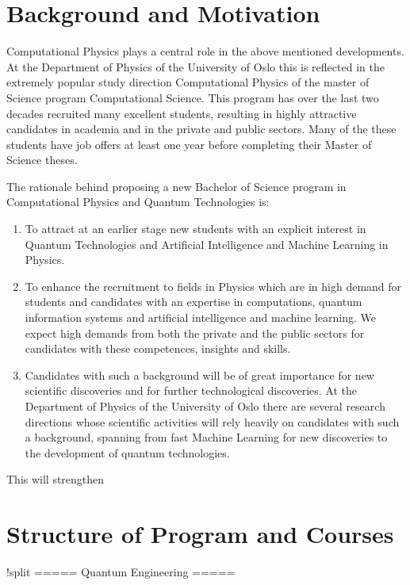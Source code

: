 \documentclass[oneside,final,10pt]{article}
\begin{document}
\section{Background and Motivation}

Computational Physics plays a central role in the above mentioned   developments. At the Department of Physics of the University of Oslo this is reflected in the extremely popular study direction Computational Physics of the master of Science program Computational Science. This program has over the last two decades recruited many excellent students, resulting in highly attractive candidates in academia and in  the private and public sectors. Many of the these students have job offers at least one year before completing their Master of Science theses.

The rationale behind proposing a new Bachelor of Science program in Computational Physics and Quantum Technologies is:
\begin{enumerate}
    \item To attract at an earlier stage new students with an explicit interest in Quantum Technologies and Artificial Intelligence and Machine Learning in Physics. 
    \item To enhance the recruitment to fields in Physics which are in high demand for students and candidates with an expertise in computations, quantum information systems and artificial intelligence and machine learning. We expect high demands from both the private and the public sectors for candidates with these competences, insights and skills.
    \item Candidates with such a background will be of great importance for new scientific discoveries and for further technological discoveries. At the Department of Physics of the University of Oslo there are several research directions whose scientific activities will rely heavily on candidates with such a background, spanning from fast Machine Learning for new discoveries to the development of quantum technologies.   
\end{enumerate}


This will strengthen 



\section{Structure of Program and Courses}

!split
===== Quantum Engineering =====
\end{document}
